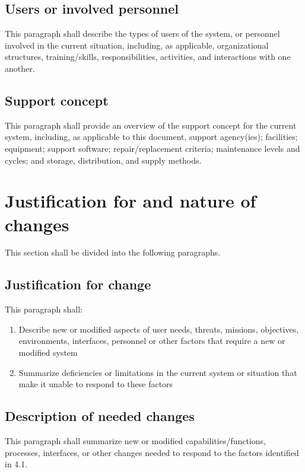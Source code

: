 \documentclass{fidata-report-template}
\begin{document}
\subsection{Users or involved personnel}

This paragraph shall describe the types of users of the system, or
personnel involved in the current situation, including, as applicable,
organizational structures, training/skills, responsibilities,
activities, and interactions with one another.

\subsection{Support concept}

This paragraph shall provide an overview of the support concept for the
current system, including, as applicable to this document, support
agency(ies); facilities; equipment; support software; repair/replacement
criteria; maintenance levels and cycles; and storage, distribution, and
supply methods.

\section{Justification for and nature of changes}

This section shall be divided into the following paragraphs.

\subsection{Justification for change}

This paragraph shall:

\begin{enumerate}
\itemsep1pt\parskip0pt
\item
  Describe new or modified aspects of user needs, threats, missions,
  objectives, environments, interfaces, personnel or other factors that
  require a new or modified system
\item
  Summarize deficiencies or limitations in the current system or
  situation that make it unable to respond to these factors
\end{enumerate}

\subsection{Description of needed changes}

This paragraph shall summarize new or modified capabilities/functions,
processes, interfaces, or other changes needed to respond to the factors
identified in 4.1.
\end{document}
